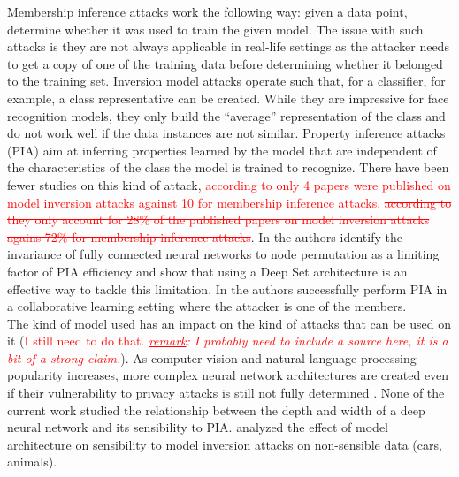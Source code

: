\documentclass[11pt]{article}
\begin{document}
Membership inference attacks work the following way: given a data point, determine whether it was used to train the given model. The issue with such attacks is they are not always applicable in real-life settings as the attacker needs to get a copy of one of the training data before determining whether it belonged to the training set. Inversion model attacks operate such that, for a classifier, for example, a class representative can be created. While they are impressive for face recognition models, they only build the “average” representation of the class and do not work well if the data instances are not similar.
Property inference attacks (PIA) aim at inferring properties learned by the model that are independent of the characteristics of the class the model is trained to recognize. There have been fewer studies on this kind of attack, \textcolor{red}{according to \citet{He2019} only 4 papers were published on model inversion attacks against 10 for membership inference attacks. \sout{according to \cite{He2019} they only account for 28\% of the published papers on model inversion attacks agains 72\% for membership inference attacks}}. In \cite{Ganju2018} the authors identify the invariance of fully connected neural networks to node permutation as a limiting factor of PIA efficiency and show that using a Deep Set architecture \cite{zaheer2017deep} is an effective way to tackle this limitation. In \cite{Melis2019} the authors successfully perform PIA in a collaborative learning setting where the attacker is one of the members.\\

The kind of model used has an impact on the kind of attacks that can be used on it (\textcolor{red}{I still need to do that. \textit{\underline{remark}: I probably need to include a source here, it is a bit of a strong claim.}}). As computer vision and natural language processing popularity increases, more complex neural network architectures are created even if their vulnerability to privacy attacks is still not fully determined \cite{He2019}. None of the current work studied the relationship between the depth and width of a deep neural network and its sensibility to PIA. \citet{Geiping2020} analyzed the effect of model architecture on sensibility to model inversion attacks on non-sensible data (cars, animals).\\
\end{document}
